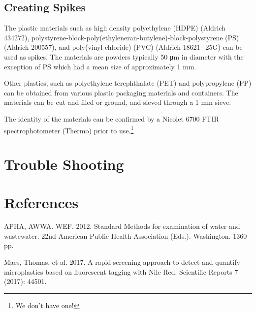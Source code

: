 \documentclass[12pt]{../SOP4_alpha}\usepackage[]{graphicx}\usepackage[]{color}
\begin{document}
\subsection{Creating Spikes}

\NP The plastic materials such as high density polyethylene (HDPE) (Aldrich 434272),
polystyrene-block-poly(ethyleneran-butylene)-block-polystyrene (PS) 
(Aldrich 200557), and poly(vinyl chloride) (PVC) (Aldrich 18621−25G) can
be used as spikes. The materials are powders typically 50 μm in diameter with the
exception of PS which had a mean size of approximately 1 mm.

\NP Other plastics, such as polyethylene terephthalate (PET) and
polypropylene (PP) can be obtained from various plastic
packaging materials and containers. The materials can be cut and
filed or ground, and sieved through a 1 mm sieve. 

\NP The identity of the materials can be confirmed by a Nicolet 6700 FTIR
spectrophotometer (Thermo) prior to use.\footnote{We don't have one!} 


\section{Trouble Shooting}

\section{References}

\NP APHA, AWWA. WEF. 2012. Standard Methods for examination of water and wastewater. 22nd American Public Health Association (Eds.). Washington. 1360 pp.

\NP Maes, Thomas, et al. 2017. A rapid-screening approach to detect and quantify microplastics based on fluorescent tagging with Nile Red. Scientific Reports 7 (2017): 44501.


%
\end{document}
